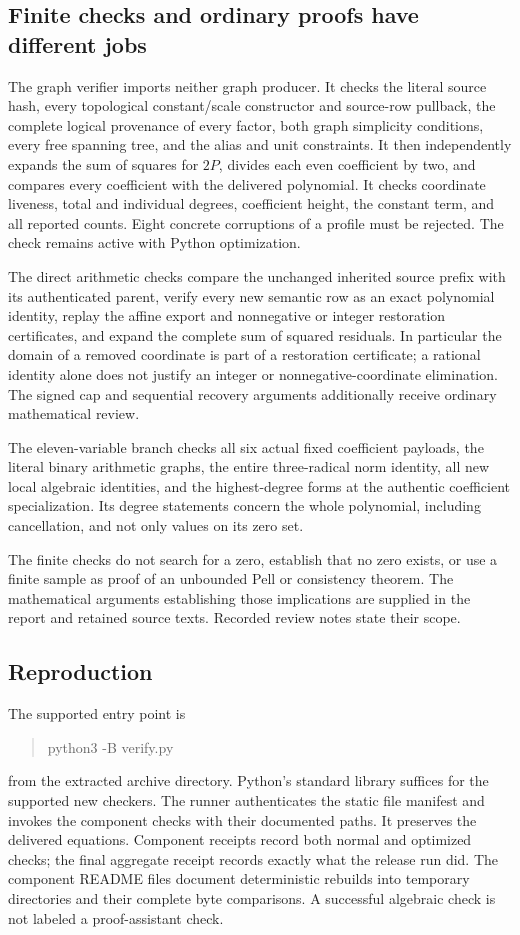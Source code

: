 \subsection{Finite checks and ordinary proofs have different jobs}
The graph verifier imports neither graph producer. It checks the literal source
hash, every topological constant/scale constructor and source-row pullback,
the complete logical provenance of every factor, both graph simplicity
conditions, every free spanning tree, and the alias and unit constraints.
It then independently expands the sum of squares for $2P$, divides each even
coefficient by two, and compares every coefficient with the delivered polynomial.
It checks coordinate liveness, total and individual degrees, coefficient height,
the constant term, and all reported counts. Eight concrete corruptions of a
profile must be rejected. The check remains active with Python optimization.

The direct arithmetic checks compare the unchanged inherited source prefix
with its authenticated parent, verify every new semantic row as an exact
polynomial identity, replay the affine export and nonnegative or integer
restoration certificates, and expand the complete sum of squared residuals.
In particular the domain of a removed coordinate is part of a restoration
certificate; a rational identity alone does not justify an integer or
nonnegative-coordinate elimination. The signed cap and sequential recovery
arguments additionally receive ordinary mathematical review.

The eleven-variable branch checks all six actual fixed coefficient payloads,
the literal binary arithmetic graphs, the entire three-radical norm identity,
all new local algebraic identities, and the highest-degree forms at the
authentic coefficient specialization. Its degree statements concern the
whole polynomial, including cancellation, and not only values on its zero set.

The finite checks do not search for a zero, establish that no zero exists,
or use a finite sample as proof of an unbounded Pell or consistency theorem.
The mathematical arguments establishing those implications are supplied in
the report and retained source texts. Recorded review notes state their scope.

\subsection{Reproduction}
The supported entry point is
\begin{quote}\ttfamily
python3 -B verify.py
\end{quote}
from the extracted archive directory. Python's standard library suffices for
the supported new checkers. The runner authenticates the static file manifest
and invokes the component checks with their documented paths. It preserves
the delivered equations. Component receipts record both normal and optimized
checks; the final aggregate receipt records exactly what the release run did.
The component README files document deterministic rebuilds into temporary
directories and their complete byte comparisons. A successful algebraic check
is not labeled a proof-assistant check.

